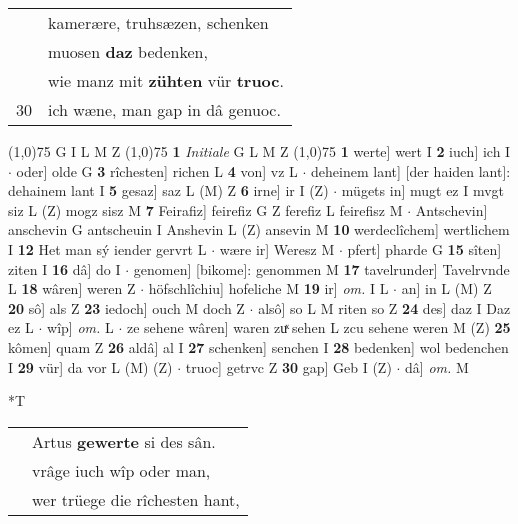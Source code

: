 \documentclass[8pt,a4paper,notitlepage]{article}
\begin{document}
\begin{table}[ht]
\begin{minipage}[t]{0.5\linewidth}
\begin{tabular}{rl}
 & kamerære, truhsæzen, schenken\\ 
 & muosen \textbf{daz} bedenken,\\ 
 & wie manz mit \textbf{zühten} vür \textbf{truoc}.\\ 
30 & ich wæne, man gap in dâ genuoc.\\ 
\end{tabular}
\scriptsize
\line(1,0){75} \newline
G I L M Z \newline
\line(1,0){75} \newline
\textbf{1} \textit{Initiale} G L M Z  \newline
\line(1,0){75} \newline
\textbf{1} werte] wert I \textbf{2} iuch] ich I  $\cdot$ oder] olde G \textbf{3} rîchesten] richen L \textbf{4} von] vz L  $\cdot$ deheinem lant] [der haiden lant]: dehainem lant I \textbf{5} gesaz] saz L (M) Z \textbf{6} irne] ir I (Z)  $\cdot$ mügets in] mugt ez I mvgt siz L (Z) mogz sisz M \textbf{7} Feirafiz] feirefiz G Z ferefiz L feirefisz M  $\cdot$ Antschevin] anschevin G antscheuin I Anshevin L (Z) ansevin M \textbf{10} werdeclîchem] wertlichem I \textbf{12} Het man sý iender gervrt L  $\cdot$ wære ir] Weresz M  $\cdot$ pfert] pharde G \textbf{15} sîten] ziten I \textbf{16} dâ] do I  $\cdot$ genomen] [bikome]: genommen M \textbf{17} tavelrunder] Tavelrvnde L \textbf{18} wâren] weren Z  $\cdot$ höfschlîchiu] hofeliche M \textbf{19} ir] \textit{om.} I L  $\cdot$ an] in L (M) Z \textbf{20} sô] als Z \textbf{23} iedoch] ouch M doch Z  $\cdot$ alsô] so L M riten so Z \textbf{24} des] daz I Daz ez L  $\cdot$ wîp] \textit{om.} L  $\cdot$ ze sehene wâren] waren zuͯ sehen L zcu sehene weren M (Z) \textbf{25} kômen] quam Z \textbf{26} aldâ] al I \textbf{27} schenken] senchen I \textbf{28} bedenken] wol bedenchen I \textbf{29} vür] da vor L (M) (Z)  $\cdot$ truoc] getrvc Z \textbf{30} gap] Geb I (Z)  $\cdot$ dâ] \textit{om.} M \newline
\end{minipage}
\hspace{0.5cm}
\begin{minipage}[t]{0.5\linewidth}
\small
\begin{center}*T
\end{center}
\begin{tabular}{rl}
 & Artus \textbf{gewerte} si des sân.\\ 
 & vrâge iuch wîp oder man,\\ 
 & wer trüege die rîchesten hant,\\ 

\end{tabular}
\end{minipage}
\end{table}
\end{document}
